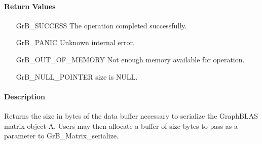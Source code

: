 \paragraph{Return Values}

\begin{itemize}[leftmargin=2.3in]
    \item[{\sf GrB\_SUCCESS}]         The operation completed successfully.

    \item[{\sf GrB\_PANIC}]           Unknown internal error.
    
    \item[{\sf GrB\_OUT\_OF\_MEMORY}] Not enough memory available for operation.
    
    \item[{\sf GrB\_NULL\_POINTER}]  {\sf size} is {\sf NULL}.
\end{itemize}

\paragraph{Description}

Returns the size in bytes of the data buffer necessary to serialize the
GraphBLAS matrix object {\sf A}.  Users may then allocate a buffer of {\sf size}
bytes to pass as a parameter to {\sf GrB\_Matrix\_serialize}.
